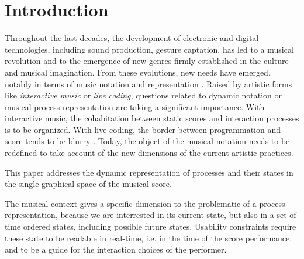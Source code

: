 \documentclass{article}
\title{\papertitle}
\begin{document}
%
\capstartfalse
\maketitle
\capstarttrue
%
\begin{abstract}
The paper presents a study about the representation of musical computer processes within a music score. The idea is to provide performers with information that could be useful especially in the context of interactive music. The paper starts with a characterization of a musical computer process in order to define the \emph{values} to be represented. Next it proposes an approach to time representation suitable to asynchronous processes representation.
\end{abstract}
%

\section{Introduction}\label{sec:intro}
Throughout the last decades, the development of electronic and digital technologies, including sound production, gesture captation, has led to a musical revolution and to the emergence of new genres firmly established in the culture and musical imagination.
From these evolutions, new needs have emerged, notably in terms of music notation and representation \cite{freeman11}. Raised by artistic forms like \emph{interactive music} or \emph{live coding}, questions related to dynamic notation or musical process representation are taking a significant importance. With interactive music, the cohabitation between static scores and interaction processes is to be organized. With live coding, the border between programmation and score tends to be blurry \cite{magnuss11}.
Today, the object of the musical notation needs to be redefined to take account of the new dimensions of the current artistic practices.

This paper addresses the dynamic representation of processes and their states in the single graphical space of the musical score. 

The musical context gives a specific dimension to the problematic of a process representation, because we are interrested in its current state, but also in a set of time ordered states, including possible future states. Usability constraints require these state to be readable in real-time, i.e. in the time of the score performance, and to be a guide for the interaction choices of the performer.
\end{document}
